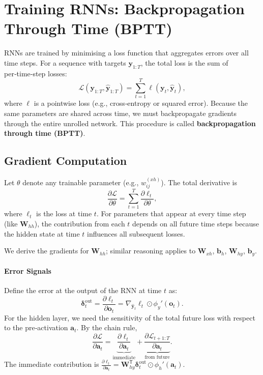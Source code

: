 \documentclass{tufte-handout}
\begin{document}
\section{Training RNNs: Backpropagation Through Time (BPTT)}

RNNs are trained by minimising a loss function that aggregates errors over all time steps. For a sequence with targets $\mathbf{y}_{1:T}$, the total loss is the sum of per‑time‑step losses:
\[
\mathcal{L}(\mathbf{y}_{1:T}, \hat{\mathbf{y}}_{1:T}) = \sum_{t=1}^{T} \ell(\mathbf{y}_t, \hat{\mathbf{y}}_t),
\]
where $\ell$ is a pointwise loss (e.g., cross‑entropy or squared error). Because the same parameters are shared across time, we must backpropagate gradients through the entire unrolled network. This procedure is called \textbf{backpropagation through time (BPTT)}.

\subsection{Gradient Computation}

Let $\theta$ denote any trainable parameter (e.g., $w_{ij}^{(xh)}$). The total derivative is
\[
\frac{\partial \mathcal{L}}{\partial \theta} = \sum_{t=1}^{T} \frac{\partial \ell_t}{\partial \theta},
\]
where $\ell_t$ is the loss at time $t$. For parameters that appear at every time step (like $\mathbf{W}_{hh}$), the contribution from each $t$ depends on all future time steps because the hidden state at time $t$ influences all subsequent losses.

We derive the gradients for $\mathbf{W}_{hh}$; similar reasoning applies to $\mathbf{W}_{xh}$, $\mathbf{b}_h$, $\mathbf{W}_{hy}$, $\mathbf{b}_y$.

\paragraph{Error Signals}
Define the error at the output of the RNN at time $t$ as:
\[
\boldsymbol{\delta}_t^{\text{out}} = \frac{\partial \ell_t}{\partial \mathbf{o}_t} = \nabla_{\hat{\mathbf{y}}_t} \ell_t \odot \phi_y'(\mathbf{o}_t).
\]
For the hidden layer, we need the sensitivity of the total future loss with respect to the pre‑activation $\mathbf{a}_t$. By the chain rule,
\[
\frac{\partial \mathcal{L}}{\partial \mathbf{a}_t} = \underbrace{\frac{\partial \ell_t}{\partial \mathbf{a}_t}}_{\text{immediate}} + \underbrace{\frac{\partial \mathcal{L}_{t+1:T}}{\partial \mathbf{a}_t}}_{\text{from future}}.
\]
The immediate contribution is $\frac{\partial \ell_t}{\partial \mathbf{a}_t} = \mathbf{W}_{hy}^{\mathsf{T}} \boldsymbol{\delta}_t^{\text{out}} \odot \phi_h'(\mathbf{a}_t)$.
\end{document}
